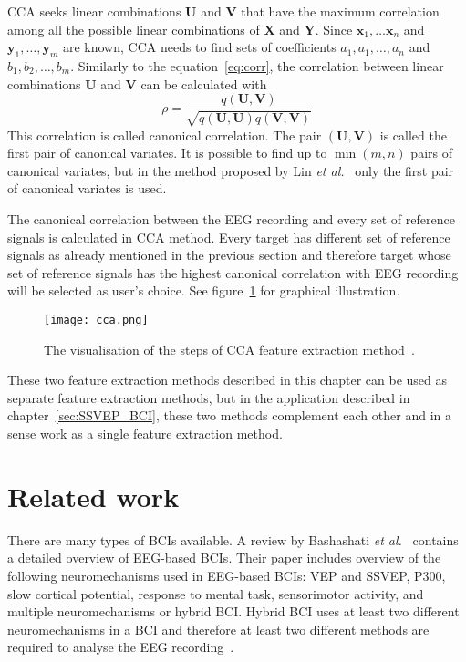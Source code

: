 \gls{CCA} seeks \glspl{linear combination} $\mathbf{U}$ and $\mathbf{V}$ that have the maximum \gls{correlation} among all the possible \glspl{linear combination} of $\mathbf{X}$ and $\mathbf{Y}$. Since $\mathbf{x}_1,\dots\mathbf{x}_n$ and $\mathbf{y}_1,\dots,\mathbf{y}_m$ are known, \gls{CCA}  needs to find sets of coefficients $a_1, a_1, \dots, a_n$ and $b_1, b_2, \dots, b_m$. Similarly to the equation~\ref{eq:corr}, the \gls{correlation} between \glspl{linear combination} $\mathbf{U}$ and $\mathbf{V}$ can be calculated with
\begin{equation}
	\rho = \frac{q(\mathbf{U}, \mathbf{V})}{\sqrt{q(\mathbf{U},\mathbf{U})q(\mathbf{V},\mathbf{V})}}
\end{equation}
This \gls{correlation} is called \gls{canonical correlation}. The pair $(\mathbf{U}, \mathbf{V})$ is called the first pair of canonical variates. It is possible to find up to $\min(m, n)$ pairs of canonical variates, but in the method proposed by Lin \textit{et al.}~\cite{cca_lin} only the first pair of canonical variates is used.

The \gls{canonical correlation} between the \gls{EEG} recording and every set of \glspl{reference signal} is calculated in \gls{CCA} method. Every \gls{target} has different set of \glspl{reference signal} as already mentioned in the previous section and therefore \gls{target} whose set of \glspl{reference signal} has the highest \gls{canonical correlation} with \gls{EEG} recording will be selected as user's choice. See figure~\ref{fig:cca} for graphical illustration.

\begin{figure}[h]
	\centering
	\texttt{[image: cca.png]}
	\caption{The visualisation of the steps of CCA feature extraction method~\cite{bin2009cca}.}
	\label{fig:cca}
\end{figure}

These two \gls{feature extraction} methods described in this chapter can be used as separate \gls{feature extraction} methods, but in the application described in chapter~\ref{sec:SSVEP_BCI}, these two methods complement each other and in a sense work as a single \gls{feature extraction} method.

\section{Related work}

There are many types of \glspl{BCI} available. A review by Bashashati \textit{et al.}~\cite{bci_comparison} contains a detailed overview of \gls{EEG}-based \glspl{BCI}. Their paper includes overview of the following neuromechanisms used in \gls{EEG}-based \glspl{BCI}: \gls{VEP} and \gls{SSVEP}, P300, slow cortical potential, response to mental task, sensorimotor activity, and multiple neuromechanisms or hybrid \gls{BCI}. Hybrid \gls{BCI} uses at least two different neuromechanisms in a \gls{BCI} and therefore at least two different methods are required to analyse the \gls{EEG} recording~\cite{hybrid_bci, hybrid_bci2}.

